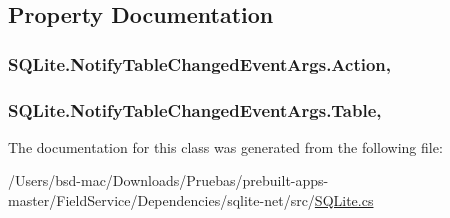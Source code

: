 \subsection{Property Documentation}
\hypertarget{class_s_q_lite_1_1_notify_table_changed_event_args_a16ae425a42440111c97e1d5246f111af}{
\subsubsection[{Action}]{ S\+Q\+Lite.\+Notify\+Table\+Changed\+Event\+Args.\+Action\hspace{0.3cm}{\ttfamily [get]}, {\ttfamily [set]}}}\label{class_s_q_lite_1_1_notify_table_changed_event_args_a16ae425a42440111c97e1d5246f111af}
\hypertarget{class_s_q_lite_1_1_notify_table_changed_event_args_ad46678388a789010e9517a8cb1348a20}{
\subsubsection[{Table}]{ S\+Q\+Lite.\+Notify\+Table\+Changed\+Event\+Args.\+Table\hspace{0.3cm}{\ttfamily [get]}, {\ttfamily [set]}}}\label{class_s_q_lite_1_1_notify_table_changed_event_args_ad46678388a789010e9517a8cb1348a20}


The documentation for this class was generated from the following file\+:\begin{DoxyCompactItemize}
\item 
/\+Users/bsd-\/mac/\+Downloads/\+Pruebas/prebuilt-\/apps-\/master/\+Field\+Service/\+Dependencies/sqlite-\/net/src/\hyperlink{_s_q_lite_8cs}{S\+Q\+Lite.\+cs}\end{DoxyCompactItemize}

